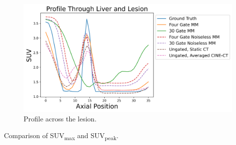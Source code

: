 \documentclass[portrait, color=UCLburgundy, margin=1cm]{uclposter}
\begin{document}
    \begin{multicols}{2}
        \begin{figure}[H]
            \centering
            
            \includegraphics[width=1.0\linewidth]{profile.png}
            
            \begin{highlightbox}[UCLlightblue]
                \captionsetup{singlelinecheck=false, justification=centering}
                \caption{Profile across the lesion.}
            \end{highlightbox}
            
            \label{fig:profile}
        \end{figure}
        
        \begin{table}[H]
            \centering
            
            \begin{highlightbox}[UCLlightblue]
                \captionsetup{singlelinecheck=false, justification=centering}
                \caption{Comparison of \gls{SUV}\textsubscript{max} and \gls{SUV}\textsubscript{peak}.}
            \end{highlightbox}
            
            \vspace{1.0cm}
            

\end{table}
\end{multicols}
\end{document}
